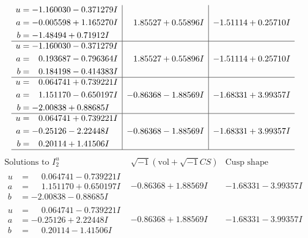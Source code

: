 \documentclass[1p]{elsarticle_modified}
\theoremstyle{definition}
\newcommand{\I}{\sqrt{-1}}
\begin{document}
$$\begin{array}{c|c|c}
\begin{aligned}
u &= -1.160030 - 0.371279 I \\
a &= -0.005598 + 1.165270 I \\
b &= -1.48494 + 0.71912 I\end{aligned}
 & \phantom{-}1.85527 + 0.55896 I & -1.51114 + 0.25710 I \\ \hline\begin{aligned}
u &= -1.160030 - 0.371279 I \\
a &= \phantom{-}0.193687 - 0.796364 I \\
b &= \phantom{-}0.184198 - 0.414383 I\end{aligned}
 & \phantom{-}1.85527 + 0.55896 I & -1.51114 + 0.25710 I \\ \hline\begin{aligned}
u &= \phantom{-}0.064741 + 0.739221 I \\
a &= \phantom{-}1.151170 - 0.650197 I \\
b &= -2.00838 + 0.88685 I\end{aligned}
 & -0.86368 - 1.88569 I & -1.68331 + 3.99357 I \\ \hline\begin{aligned}
u &= \phantom{-}0.064741 + 0.739221 I \\
a &= -0.25126 - 2.22448 I \\
b &= \phantom{-}0.20114 + 1.41506 I\end{aligned}
 & -0.86368 - 1.88569 I & -1.68331 + 3.99357 I\\
 \hline 
 \end{array}$$\newpage$$\begin{array}{c|c|c}  
\text{Solutions to }I^u_{2}& \I (\text{vol} + \sqrt{-1}CS) & \text{Cusp shape}\\
 \hline 
\begin{aligned}
u &= \phantom{-}0.064741 - 0.739221 I \\
a &= \phantom{-}1.151170 + 0.650197 I \\
b &= -2.00838 - 0.88685 I\end{aligned}
 & -0.86368 + 1.88569 I & -1.68331 - 3.99357 I \\ \hline\begin{aligned}
u &= \phantom{-}0.064741 - 0.739221 I \\
a &= -0.25126 + 2.22448 I \\
b &= \phantom{-}0.20114 - 1.41506 I\end{aligned}
 & -0.86368 + 1.88569 I & -1.68331 - 3.99357 I \\ \hline\begin{aligned}

\end{aligned}
\end{array}$$
\end{document}
